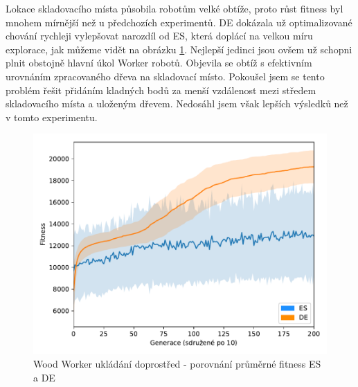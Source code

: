   	Lokace skladovacího místa působila robotům velké obtíže, proto růst fitness byl mnohem mírnější než u předchozích experimentů. DE dokázala už optimalizované chování rychleji vylepšovat narozdíl od ES, která doplácí na velkou míru explorace, jak můžeme vidět na obrázku \ref{obr04:StockESvsDE}. Nejlepší jedinci jsou ovšem už schopni plnit obstojně hlavní úkol Worker robotů. Objevila se obtíž s efektivním urovnáním zpracovaného dřeva na skladovací místo. Pokoušel jsem se tento problém řešit přidáním kladných bodů za menší vzdálenost mezi středem skladovacího místa a uloženým dřevem. Nedosáhl jsem však lepších výsledků než v tomto experimentu. 
   	\newpage
	\begin{figure}[h]\centering
		\includegraphics[width=\columnwidth]{../img/WoodMap/DEvsES/WorkerStockMem}
		\caption{Wood Worker ukládání doprostřed  - porovnání průměrné fitness ES a DE}
		\label{obr04:StockESvsDE}
	\end{figure}
